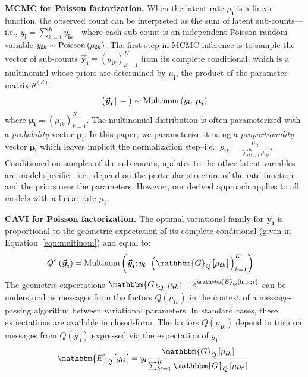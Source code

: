 \documentclass{article}
\newcommand{\subs}{\pmb{i}}
\newcommand{\ysk}{y_{\subs k}}
\newcommand{\ys}{y_{\subs}}
\newcommand{\mus}{\mu_{\subs}}
\newcommand{\musk}{\mu_{\subs k}}
\newcommand{\yvs}{\vec{\boldsymbol{y}}_{\subs}}
\newcommand{\Multi}[1]{\textup{Multinom}\left( #1 \right)}
\newcommand{\Pois}[1]{\textup{Poisson}\left( #1 \right)}
\newcommand{\Eq}[1]{\mathbbm{E}_Q\left[#1\right]}
\newcommand{\Gq}[1]{\mathbbm{G}_Q\left[#1\right]}
\newcommand{\given}{\,|\,}
\newcommand{\teq}{\!=\!}
\newcommand{\compcond}[1]{\big(#1\given-\big)}
\begin{document}
  \textbf{MCMC for Poisson factorization.} When the latent rate $\mus$ is a linear
  function, the observed count can be interpreted as the sum of latent
  sub-counts---i.e., $\ys = \sum_{k=1}^K \ysk$---where each sub-count is an
  independent Poisson random variable $\ysk \sim \Pois{\musk}$. The first step
  in MCMC inference is to sample the vector of sub-counts $\yvs \teq
  \left(\ysk\right)_{k=1}^K$ from its complete conditional, which is a
  multinomial whose priors are determined by $\mus$, the product of the
  parameter matrix $\theta^{(d)}$:
  \begin{equation}
  \label{eqn:multinom}
  \compcond{\yvs} \sim \Multi{\ys,\, \boldsymbol{\mu}_{\subs}}
  \end{equation}
  where $\boldsymbol{\mu}_{\subs}\teq \left(\musk\right)_{k=1}^K$. The
  multinomial distribution is often parameterized with a \emph{probability}
  vector $\boldsymbol{p}_{\subs}$. In this paper, we parameterize it using a
  \emph{proportionality} vector $\boldsymbol{\mu}_{\subs}$ which leaves implicit
  the normalization step--i.e., $p_{\subs k} = \frac{\musk}{\sum_{k'=1}^K
  \mu_{\subs k'}}$. Conditioned on samples of the sub-counts, updates to the
  other latent variables are model-specific---i.e., depend on the particular
  structure of the rate function and the priors over the parameters. However,
  our derived approach applies to all models with a linear rate $\mus$. 
  
  \textbf{CAVI for Poisson factorization.} The optimal variational family for
  $\yvs$ is proportional to the geometric expectation of its complete
  conditional (given in Equation~\ref{eqn:multinom}) and equal to:
  \begin{align}
  Q^*\left(\yvs\right) 
  &= \Multi{\yvs; \ys,\, \Big(\Gq{\musk}\Big)_{k=1}^K}
  \end{align}
  The geometric expectations $\Gq{\musk} = e^{\Eq{\ln \musk}}$ can be understood
  as messages from the factors $Q(\musk)$ in the context of a message-passing
  algorithm between variational parameters. In standard cases, these
  expectations are available in closed-form. The factors $Q(\musk)$ depend in
  turn on messages from $Q(\yvs)$ expressed via the expectation of $\ys$:
  \begin{equation}
      \Eq{\ysk}=\ys\frac{\Gq{\musk}}{\sum_{k'=1}^K \Gq{\mu_{\subs k'}}}.
  \end{equation}
  
\end{document}
